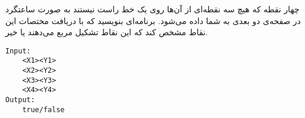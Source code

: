 \documentclass[../main.tex]{subfiles}
\begin{document}

چهار نقطه که هیچ سه نقطه‌ای از آن‌ها روی یک خط راست نیستند به صورت ساعتگرد در صفحه‌ی دو بعدی به شما داده می‌شود.
برنامه‌ای بنویسید که با دریافت مختصات این نقاط مشخص کند که این نقاط تشکیل مربع می‌دهند یا خیر.

\begin{latin}
\begin{verbatim}
Input:
    <X1><Y1>
    <X2><Y2>
    <X3><Y3>
    <X4><Y4>
Output:
    true/false
\end{verbatim}
\end{latin}
\end{document}
